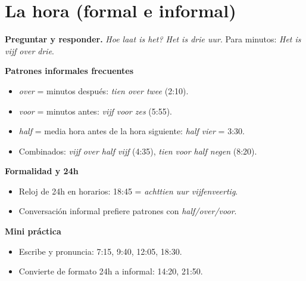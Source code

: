 \section{La hora (formal e informal)}
\textbf{Preguntar y responder.} \textit{Hoe laat is het? Het is drie uur}. Para minutos: \textit{Het is vijf over drie}.

\textbf{Patrones informales frecuentes}
\begin{itemize}[leftmargin=*]
  \item \textit{over} = minutos después: \textit{tien over twee} (2:10).
  \item \textit{voor} = minutos antes: \textit{vijf voor zes} (5:55).
  \item \textit{half} = media hora antes de la hora siguiente: \textit{half vier} = 3:30.
  \item Combinados: \textit{vijf over half vijf} (4:35), \textit{tien voor half negen} (8:20).
\end{itemize}

\textbf{Formalidad y 24h}
\begin{itemize}[leftmargin=*]
  \item Reloj de 24h en horarios: 18:45 = \textit{achttien uur vijfenveertig}.
  \item Conversación informal prefiere patrones con \textit{half/over/voor}.
\end{itemize}

\textbf{Mini práctica}
\begin{itemize}[leftmargin=*]
  \item Escribe y pronuncia: 7:15, 9:40, 12:05, 18:30.
  \item Convierte de formato 24h a informal: 14:20, 21:50.
\end{itemize}

